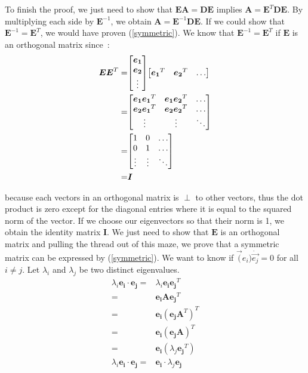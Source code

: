 \documentclass[11pt,twocolumn]{amsart} %
\newcommand{\ve}[1]{\boldsymbol{#1}}
\newcommand{\ma}[1]{\boldsymbol{#1}}
\newenvironment{m}{\begin{bmatrix}}{\end{bmatrix}}
\begin{document}
To finish the proof, we just need to show that $\ma{E}\ma{A} = \ma{D}\ma{E}$ implies $\ma{A} = \ma{E}^T\ma{D}\ma{E}$. By multiplying each side by $\ma{E}^{-1}$, we obtain $\ma{A} = \ma{E}^{-1}\ma{D}\ma{E}$. If we could show that $\ma{E}^{-1} = \ma{E}^T$, we would have proven (\ref{symmetric}). We know that $\ma{E}^{-1} = \ma{E}^T$ if $\ma{E}$ is an orthogonal matrix since~:
\begin{align*}
  \ma{E}\ma{E}^T = & \begin{m} \ve{e_1} \\ \ve{e_2} \\ \vdots \end{m} \begin{m} \ve{e_1}^T & \ve{e_2}^T & \hdots \end{m} \\
                 = & \begin{m} \ve{e_1}\ve{e_1}^T & \ve{e_1}\ve{e_2}^T & \hdots \\ \ve{e_2}\ve{e_1}^T & \ve{e_2}\ve{e_2}^T & \hdots \\ \vdots & \vdots & \ddots \end{m} \\
                 = & \begin{m} 1 & 0 & \hdots \\ 0 & 1 & \hdots \\ \vdots & \vdots & \ddots \end{m} \\
                 = & \ma{I}
\end{align*}

because each vectors in an orthogonal matrix is $\perp$ to other vectors, thus the dot product is zero except for the diagonal entries where it is equal to the squared norm of the vector. If we choose our eigenvectors so that their norm is 1, we obtain the identity matrix $\ma{I}$. We just need to show that $\ma{E}$ is an orthogonal matrix and pulling the thread out of this maze, we prove that a symmetric matrix can be expressed by (\ref{symmetric}). We want to know if $\vec(e_i) \dot \vec{e_j} = 0$ for all $i \not= j$. Let $\lambda_i$ and $\lambda_j$ be two distinct eigenvalues.
\begin{align*}
  \lambda_i\ve{e_i} \cdot \ve{e_j} = & \lambda_i\ve{e_i}\ve{e_j}^T \\
                                  = & \ve{e_i}\ma{A}\ve{e_j}^T \\
                                  = & \ve{e_i}(\ve{e_j}\ma{A}^T)^T \\
                                  = & \ve{e_i}(\ve{e_j}\ma{A})^T \\
                                  = & \ve{e_i}(\lambda_j\ve{e_j}^T) \\
  \lambda_i\ve{e_i} \cdot \ve{e_j} = & \ve{e_i} \cdot \lambda_j\ve{e_j}
\end{align*}
\end{document}
